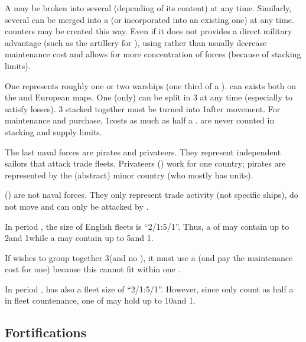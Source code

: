 
 A \FLEET may be broken into several \ND
(depending of its content) at any time.
\bparag Similarly, several \ND can be merged into a \FLEET (or incorporated
into an existing one) at any time. \FLEET counters may be created this way.
\bparag Even if it does not provides a direct military advantage (such as the
artillery for \ARMY), using \FLEET rather than \ND usually decrease
maintenance cost and allows for more concentration of forces (because of
stacking limits).

 One \NDE represents roughly one or two
warships (one third of a \NWD).
\bparag \NDE can exists both on the \ROTW and European maps.
\bparag One \NWD (only) can be split in 3 \NDE at any time (especially to
satisfy losses). 3 \NDE stacked together must be turned into 1\NWD after
movement.
\bparag For maintenance and purchase, 1\NDE costs as much as half a \NWD.
\bparag \NDE are never counted in stacking and supply limits.

\aparag[Pirates.] The last naval forces are pirates and privateers. They
represent independent sailors that attack trade fleets. Privateers (\corsaire)
work for one country; pirates are represented by the (abstract) minor country
 (who mostly has \corsaire units).

 (\TradeFLEET) are not naval forces. They only represent
trade activity (not specific ships), do not move and can only be attacked by
\corsaire.

\begin{exemple}
  In period , the size of English fleets is ``2/1:5/1''. Thus, a
  \FLEET\Facemoins of \ANG may contain up to 2\NWD and 1\NTD while a
  \FLEET\Faceplus may contain up to 5\NWD and 1\NTD.

  If \ANG wishes to group together 3\NWD (and no \NTD), it must use a
  \FLEET\Faceplus (and pay the maintenance cost for one) because this cannot
  fit within one \FLEET\Facemoins.

  In period , \TUR has also a fleet size of ``2/1:5/1''. However,
  since \NGD only count as half a \ND in fleet countenance, one
  \FLEET\Faceplus of \TUR may hold up to 10\NGD and 1\NTD.
\end{exemple}



\subsection{Fortifications}

